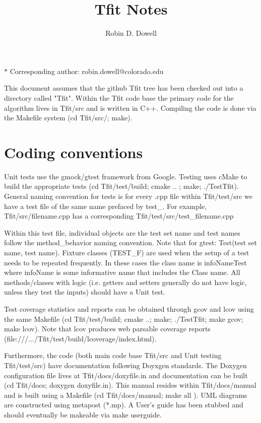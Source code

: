 \documentclass[11pt]{article}
\title{Tfit Notes}
\author{Robin D. Dowell}
\date{}
\date{ }
\begin{document}
\maketitle
\noindent $*$ Corresponding author: robin.dowell@colorado.edu

This document assumes that the github Tfit tree has been checked out into a 
directory called "Tfit".   Within the Tfit code base the primary code for the 
algorithm lives in Tfit/src and is written in C++.   Compiling the code is 
done via the Makefile system (cd Tfit/src/; make). 

\section{Coding conventions}
Unit tests use the gmock/gtest framework from Google.
Testing uses cMake to build the appropriate tests (cd Tfit/test/build; cmake .. ; make; ./TestTfit).  
General naming convention for tests is for every .cpp file within 
Tfit/test/src we have a test file of the same name prefaced by test\_.  For
example, Tfit/src/filename.cpp has a corresponding Tfit/test/src/test\_filename.cpp

Within this test file, individual objects are the test set name and test 
names follow the method\_behavior naming 
convention.  Note that for gtest: Test(test set name, test name).  Fixture
classes (TEST\_F) are used when the setup of a test needs to be 
repeated frequently.  In these cases the class name is infoNameTest where
infoName is some informative name that includes the Class name.
All methods/classes with logic (i.e. getters and setters generally do not 
have logic, unless they test the inputs) should have a Unit test.

Test coverage statistics and reports can be obtained through gcov
and lcov using the same Makefile (cd Tfit/test/build; cmake ..; make;
./TestTfit; make gcov; make lcov).  Note that lcov produces web parsable
coverage reports (file:///.../Tfit/test/build/lcoverage/index.html).

Furthermore, the code (both main code base Tfit/src and Unit testing 
    Tfit/test/src) have documentation following Doyxgen standards.   
The Doxygen configuration file
lives at Tfit/docs/doxyfile.in and documentation can be built (cd Tfit/docs; 
    doxygen doxyfile.in).   This manual resides within Tfit/docs/manual and 
is built using a Makefile (cd Tfit/docs/manual; make all ).  UML diagrams are
constructed using metapost (*.mp).  A User's guide has been stubbed and should
eventually be makeable via make userguide.
\end{document}
